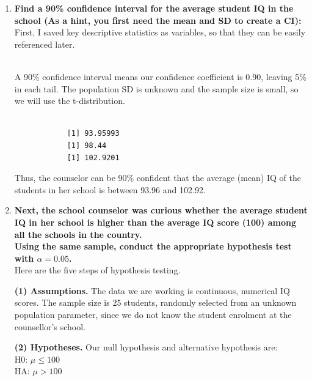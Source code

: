 \documentclass[12pt,letterpaper]{article}
\begin{document}
\begin{enumerate}
	\item \textbf{Find a 90\% confidence interval for the average student IQ in the school (As a hint, you first need the mean and SD to create a CI):}\\
	
	\noindent First, I saved key descriptive statistics as variables, so that they can be easily referenced later.\\
	
	\
	
	A 90\% confidence interval means our confidence coefficient is 0.90, leaving 5\% in each tail. The population SD is unknown and the sample size is small, so we will use the t-distribution. \\
	
		\
		
		\begin{verbatim}
			[1] 93.95993
			[1] 98.44
			[1] 102.9201
		\end{verbatim}

	\noindent Thus, the counselor can be 90\% confident that the average (mean) IQ of the students in her school is between 93.96 and 102.92.
	
		\vspace{0.5cm}
	
	\item \textbf{Next, the school counselor was curious  whether  the average student IQ in her school is higher than the average IQ score (100) among all the schools in the country.}\\ 
	
	\noindent \textbf{Using the same sample, conduct the appropriate hypothesis test with $\alpha=0.05$.}\\
	
	Here are the five steps of hypothesis testing.
	
	\textbf{(1) Assumptions.} The data we are working is continuous, numerical IQ scores. The sample size is 25 students, randomly selected from an unknown population parameter, since we do not know the student enrolment at the counsellor's school. 
	
	\textbf{(2) Hypotheses.} Our null hypothesis and alternative hypothesis are:  \\
	H0: $\mu \le 100$ \\
	HA: $\mu > 100$ \\
	

\end{enumerate}
\end{document}
